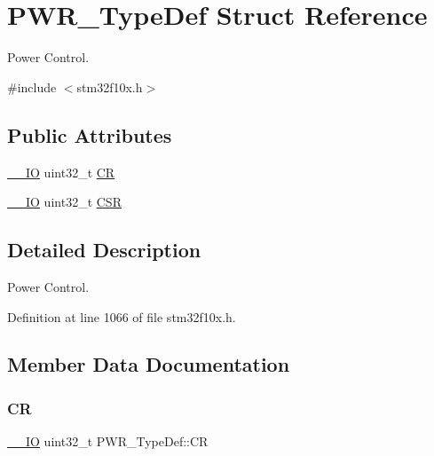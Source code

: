 \hypertarget{struct_p_w_r___type_def}{}\section{P\+W\+R\+\_\+\+Type\+Def Struct Reference}
\label{struct_p_w_r___type_def}


Power Control.  




{\ttfamily \#include $<$stm32f10x.\+h$>$}

\subsection*{Public Attributes}
\begin{DoxyCompactItemize}
\item 
\hyperlink{core__sc300_8h_aec43007d9998a0a0e01faede4133d6be}{\+\_\+\+\_\+\+IO} uint32\+\_\+t \hyperlink{struct_p_w_r___type_def_aeb6bcdb2b99d58b9a0ffd86deb606eac}{CR}
\item 
\hyperlink{core__sc300_8h_aec43007d9998a0a0e01faede4133d6be}{\+\_\+\+\_\+\+IO} uint32\+\_\+t \hyperlink{struct_p_w_r___type_def_ae17097e69c88b6c00033d6fb84a8182b}{C\+SR}
\end{DoxyCompactItemize}


\subsection{Detailed Description}
Power Control. 

Definition at line 1066 of file stm32f10x.\+h.



\subsection{Member Data Documentation}
\mbox{\label{struct_p_w_r___type_def_aeb6bcdb2b99d58b9a0ffd86deb606eac}} 
\subsubsection{\texorpdfstring{CR}{CR}}
{\footnotesize\ttfamily \hyperlink{core__sc300_8h_aec43007d9998a0a0e01faede4133d6be}{\+\_\+\+\_\+\+IO} uint32\+\_\+t P\+W\+R\+\_\+\+Type\+Def\+::\+CR}



